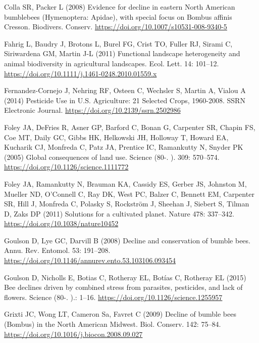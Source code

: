 \documentclass[11pt,]{article}
\begin{document}
\leavevmode\hypertarget{ref-Colla2008}{}%
Colla SR, Packer L (2008) Evidence for decline in eastern North American
bumblebees (Hymenoptera: Apidae), with special focus on Bombus affinis
Cresson. Biodivers. Conserv.
\url{https://doi.org/10.1007/s10531-008-9340-5}

\leavevmode\hypertarget{ref-Fahrig2011b}{}%
Fahrig L, Baudry J, Brotons L, Burel FG, Crist TO, Fuller RJ, Sirami C,
Siriwardena GM, Martin J-L (2011) Functional landscape heterogeneity and
animal biodiversity in agricultural landscapes. Ecol. Lett. 14: 101--12.
\url{https://doi.org/10.1111/j.1461-0248.2010.01559.x}

\leavevmode\hypertarget{ref-zym}{}%
Fernandez-Cornejo J, Nehring RF, Osteen C, Wechsler S, Martin A, Vialou
A (2014) Pesticide Use in U.S. Agriculture: 21 Selected Crops,
1960-2008. SSRN Electronic Journal.
\url{https://doi.org/10.2139/ssrn.2502986}

\leavevmode\hypertarget{ref-Foley2005a}{}%
Foley JA, DeFries R, Asner GP, Barford C, Bonan G, Carpenter SR, Chapin
FS, Coe MT, Daily GC, Gibbs HK, Helkowski JH, Holloway T, Howard EA,
Kucharik CJ, Monfreda C, Patz JA, Prentice IC, Ramankutty N, Snyder PK
(2005) Global consequences of land use. Science (80-. ). 309: 570--574.
\url{https://doi.org/10.1126/science.1111772}

\leavevmode\hypertarget{ref-Foley2011b}{}%
Foley JA, Ramankutty N, Brauman KA, Cassidy ES, Gerber JS, Johnston M,
Mueller ND, O'Connell C, Ray DK, West PC, Balzer C, Bennett EM,
Carpenter SR, Hill J, Monfreda C, Polasky S, Rockström J, Sheehan J,
Siebert S, Tilman D, Zaks DP (2011) Solutions for a cultivated planet.
Nature 478: 337--342. \url{https://doi.org/10.1038/nature10452}

\leavevmode\hypertarget{ref-Goulson2008c}{}%
Goulson D, Lye GC, Darvill B (2008) Decline and conservation of bumble
bees. Annu. Rev. Entomol. 53: 191--208.
\url{https://doi.org/10.1146/annurev.ento.53.103106.093454}

\leavevmode\hypertarget{ref-Goulson2015c}{}%
Goulson D, Nicholls E, Botias C, Rotheray EL, Botías C, Rotheray EL
(2015) Bee declines driven by combined stress from parasites,
pesticides, and lack of flowers. Science (80-. ).: 1--16.
\url{https://doi.org/10.1126/science.1255957}

\leavevmode\hypertarget{ref-Grixti2009}{}%
Grixti JC, Wong LT, Cameron Sa, Favret C (2009) Decline of bumble bees
(Bombus) in the North American Midwest. Biol. Conserv. 142: 75--84.
\url{https://doi.org/10.1016/j.biocon.2008.09.027}
\end{document}

